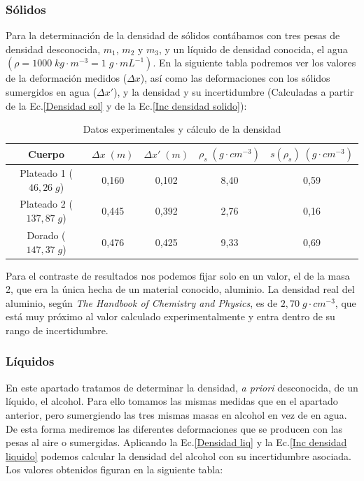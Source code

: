 \documentclass[a4paper,12pt,titlepage]{report}
\begin{document}
\subsubsection{Sólidos}

Para la determinación de la densidad de sólidos contábamos con tres pesas de densidad desconocida, $m_1$, $m_2$ y $m_3$, y un líquido de densidad conocida, el agua $(\rho = 1000 \; kg\cdot m^{-3}=1 \; g\cdot mL^{-1})$. En la siguiente tabla podremos ver los valores de la deformación medidos ($\Delta x$), así como las deformaciones con los sólidos sumergidos en agua ($\Delta x'$), y la densidad y su incertidumbre (Calculadas a partir de la Ec.\ref{Densidad sol} y de la Ec.\ref{Inc densidad solido}):

\begin{table}[h!]
    \centering
    \begin{tabular}{c|c|c|c|c|}
    \cline{1-5}
    \multicolumn{1}{|c|}{Cuerpo}        & $\Delta x \; (m)$ & $\Delta x' \; (m)$ & $\rho_s \; (g\cdot cm^{-3})$ & $s(\rho_s) \; (g\cdot cm^{-3})$ \\ \hline
    \multicolumn{1}{|c|}{Plateado 1 ($46,26 \; g$)} & 0,160  & 0,102 & 8,40 & 0,59 \\ \hline
    \multicolumn{1}{|c|}{Plateado 2 ($137,87 \; g$)} & 0,445 & 0,392 & 2,76 & 0,16 \\ \hline
    \multicolumn{1}{|c|}{Dorado ($147,37 \; g$)} & 0,476 & 0,425 & 9,33 & 0,69 \\ \hline
    \end{tabular}
    \caption{Datos experimentales y cálculo de la densidad}
    \label{Datos dens sol}
\end{table}

\newpage

Para el contraste de resultados nos podemos fijar solo en un valor, el de la masa 2, que era la única hecha de un material conocido, aluminio. La densidad real del aluminio, según \textit{The Handbook of Chemistry and Physics}, es de $2,70 \; g\cdot cm^{-3}$, que está muy próximo al valor calculado experimentalmente y entra dentro de su rango de incertidumbre.

\subsubsection{Líquidos}

En este apartado tratamos de determinar la densidad, \textit{a priori} desconocida, de un líquido, el alcohol. Para ello tomamos las mismas medidas que en el apartado anterior, pero sumergiendo las tres mismas masas en alcohol en vez de en agua. De esta forma mediremos las diferentes deformaciones que se producen con las pesas al aire o sumergidas. Aplicando la Ec.\ref{Densidad liq} y la Ec.\ref{Inc densidad liquido} podemos calcular la densidad del alcohol con su incertidumbre asociada. Los valores obtenidos figuran en la siguiente tabla:
\end{document}
